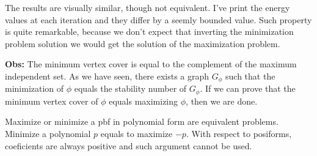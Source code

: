 The results are visually similar, though not equivalent. I've print the energy values at each iteration and they differ by a seemly bounded value. Such property is quite remarkable, because we don't expect that inverting the minimization problem solution we would get the solution of the maximization problem.

\textbf{Obs:} The minimum vertex cover is equal to the complement of the maximum independent set. As we have seen, there exists a graph $G_{\phi}$ such that the minimization of $\phi$ equals the stability number of $G_{\phi}$. If we can prove that the minimum vertex cover of $\phi$ equals maximizing $\phi$, then we are done.




Maximize or minimize a pbf in polynomial form are equivalent problems. Minimize a polynomial $p$ equals to maximize $-p$. With respect to posiforms, coeficients are always positive and such argument cannot be used.








